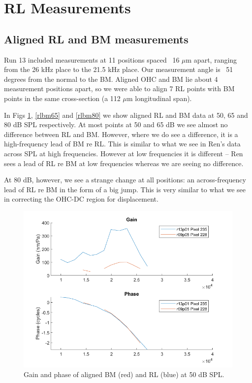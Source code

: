 \documentclass{article}
\begin{document}
\section{RL Measurements}
\subsection{Aligned RL and BM measurements}
\par{Run 13 included measurements at 11 positions spaced ~16 $\mu$m apart, ranging from the 26 kHz place to the 21.5 kHz place. Our measurement angle is ~51 degrees from the normal to the BM. Aligned OHC and BM lie about 4 measurement positions apart, so we were able to align 7 RL points with BM points in the same cross-section (a 112 $\mu$m longitudinal span).}
\par{In Figs \ref{rlbm50}, \ref{rlbm65} and \ref{rlbm80} we show aligned RL and BM data at 50, 65 and 80 dB SPL respectively. At most points at 50 and 65 dB we see almost no difference between RL and BM. However, where we do see a difference, it is a high-frequency lead of BM re RL. This is similar to what we see in Ren’s data across SPL at high frequencies. However at low frequencies it is different – Ren sees a lead of RL re BM at low frequencies whereas we are seeing no difference.}
\par{At 80 dB, however, we see a strange change at all positions: an across-frequency lead of RL re BM in the form of a big jump. This is very similar to what we see in correcting the OHC-DC region for displacement.}

\begin{figure}
	\centering
	\includegraphics[width=.7\textwidth]{Figures/rlbm50.png}
	\caption{Gain and phase of aligned BM (red) and RL (blue) at 50 dB SPL.}
	\label{rlbm50}
\end{figure}
\end{document}
